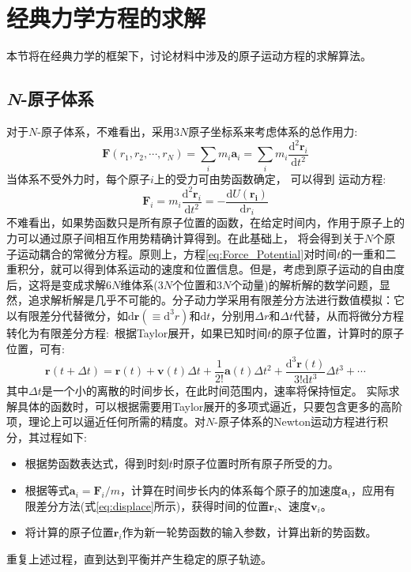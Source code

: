 \section{经典力学方程的求解}\label{section:MD_algorithm}
本节将在经典力学的框架下，讨论材料中涉及的原子运动方程的求解算法。
\subsection{{\it N}-原子体系}
对于$N$-原子体系，不难看出，采用$3N$原子坐标系来考虑体系的总作用力:
\begin{equation}
	\mathbf{F}(r_1,r_2,\cdots,r_N)=\sum_im_i\mathbf{a}_i=\sum_im_i\dfrac{\mathrm{d}^2\mathbf{r}_i}{\mathrm{d}t^2}
	\label{eq:MD_force}
\end{equation}
当体系不受外力时，每个原子$i$上的受力可由势函数确定，%
可以得到%
运动方程:
\begin{equation}
	\mathbf{F}_i=m_i\dfrac{\mathrm{d}^2\mathbf{r}_i}{\mathrm{d}t^2}=-\dfrac{\mathrm{d}U(\mathbf{r_i})}{\mathrm{d}r_i}
	\label{eq:Forece_Potential}
\end{equation}
不难看出，如果势函数只是所有原子位置的函数，在给定时间内，作用于原子上的力可以通过原子间相互作用势精确计算得到。在此基础上，%
将会得到关于$N$个原子运动耦合的常微分方程。原则上，方程\eqref{eq:Force_Potential}对时间$t$的一重和二重积分，就可以得到体系运动的速度和位置信息。但是，考虑到原子运动的自由度后，这将是变成求解$6N$维体系($3N$个位置和$3N$个动量)的解析解的数学问题，显然，追求解析解是几乎不可能的。分子动力学采用有限差分方法进行数值模拟：它以有限差分代替微分，如$\mathrm{d}\mathbf{r}(\equiv\mathrm{d}^3r)$和$\mathrm{d}t$，分别用$\Delta r$和$\Delta t$代替，从而将微分方程转化为有限差分方程:~根据\textrm{Taylor}展开，如果已知时间$t$的原子位置，计算时的原子位置，可有:
\begin{equation}
	\mathbf{r}(t+\Delta t)=\mathbf{r}(t)+\mathbf{v}(t)\Delta t+\dfrac1{2!}\mathbf{a}(t)\Delta t^2+\dfrac{\mathrm{d}^3\mathbf{r}(t)}{3!\mathrm{d}t^3}\Delta t^3+\cdots
	\label{eq:displace}
\end{equation}
其中$\Delta t$是一个小的离散的时间步长，在此时间范围内，速率将保持恒定。
实际求解具体的函数时，可以根据需要用\textrm{Taylor}展开的多项式逼近，只要包含更多的高阶项，理论上可以逼近任何所需的精度。对$N$-原子体系的\textrm{Newton}运动方程进行积分，其过程如下:
\begin{itemize}
	\item 根据势函数表达式，得到时刻$t$时原子位置时所有原子所受的力。
	\item 根据等式$\mathbf{a}_i =\mathbf{F}_i/m$，计算在时间步长内的体系每个原子的加速度$\mathbf{a}_i$，应用有限差分方法(式\eqref{eq:displace}所示)，获得时间的位置$\mathbf{r}_i$、速度$\mathbf{v}_i$。
	\item 将计算的原子位置$\mathbf{r}_i$作为新一轮势函数的输入参数，计算出新的势函数。
\end{itemize}
重复上述过程，直到达到平衡并产生稳定的原子轨迹。

